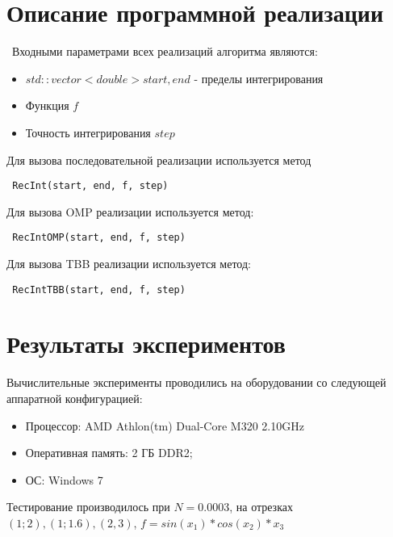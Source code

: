 \documentclass{report}
\begin{document}
 \newpage

 \section*{Описание программной реализации}
 \
 Входными параметрами всех реализаций алгоритма являются:
 \begin{itemize}
 \item $std::vector<double> start, end$ - пределы интегрирования
 \item Функция $f$
 \item Точность интегрирования $step$
 \end{itemize}

 \par Для вызова последовательной реализации используется метод 
 \begin{lstlisting}
 RecInt(start, end, f, step)
 \end{lstlisting}
 \par Для вызова OMP реализации используется метод:
 \begin{lstlisting}
 RecIntOMP(start, end, f, step)
 \end{lstlisting}
 \par Для вызова TBB реализации используется метод:
 \begin{lstlisting}
 RecIntTBB(start, end, f, step)
 \end{lstlisting}

 \newpage

 \section*{Результаты экспериментов}
 Вычислительные эксперименты проводились на оборудовании со следующей аппаратной конфигурацией:

 \begin{itemize}
 \item Процессор: AMD Athlon(tm) Dual-Core M320 2.10GHz
 \item Оперативная память: 2 ГБ DDR2;
 \item ОС: Windows 7
 \end{itemize}

 \par Тестирование производилось при $N=0.0003$, на отрезках ${(1;2),(1;1.6),(2,3)}$, $f=sin(x_1)*cos(x_2)*x_3$
 \\
\end{document}
